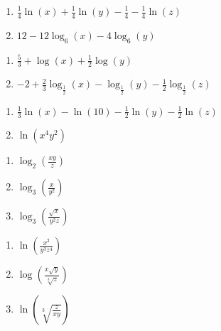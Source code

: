 \documentclass{ximera}
\begin{document}
\begin{multicols}{2}
\begin{enumerate}
\setcounter{enumi}{\value{HW}}

\item $\frac{1}{4} \ln(x) + \frac{1}{4} \ln(y) - \frac{1}{4} - \frac{1}{4} \ln(z)$
\item $12-12\log_{6}(x) - 4\log_{6}(y)$

\setcounter{HW}{\value{enumi}}
\end{enumerate}
\end{multicols}

\begin{multicols}{2}
\begin{enumerate}
\setcounter{enumi}{\value{HW}}

\item $\frac{5}{3}+\log(x)+\frac{1}{2}\log(y)$
\item $-2+\frac{2}{3}\log_{\frac{1}{2}}(x)-\log_{\frac{1}{2}}(y)-\frac{1}{2}\log_{\frac{1}{2}}(z)$

\setcounter{HW}{\value{enumi}}
\end{enumerate}
\end{multicols}

\begin{multicols}{2}
\begin{enumerate}
\setcounter{enumi}{\value{HW}}

\item $\frac{1}{3} \ln(x) - \ln(10) - \frac{1}{2}\ln(y)-\frac{1}{2}\ln(z)$
\item $\ln(x^{4}y^{2})$
\setcounter{HW}{\value{enumi}}
\end{enumerate}
\end{multicols}

\begin{multicols}{3}
\begin{enumerate}
\setcounter{enumi}{\value{HW}}

\item $\log_{2}\left(\frac{xy}{z}\right)$
\item $\log_{3} \left( \frac{x}{y^2} \right)$
\item $\log_{3}\left(\frac{\sqrt{x}}{y^{2}z}\right)$

\setcounter{HW}{\value{enumi}}
\end{enumerate}
\end{multicols}

\begin{multicols}{3}
\begin{enumerate}
\setcounter{enumi}{\value{HW}}


\item $\ln\left( \frac{x^2}{y^3z^4} \right)$
\item $\log\left(\frac{x \sqrt{y}}{\sqrt[3]{z}}  \right)$
\item $\ln\left(\sqrt[3]{\frac{z}{xy}}   \right)$

\setcounter{HW}{\value{enumi}}
\end{enumerate}
\end{multicols}
\end{document}

